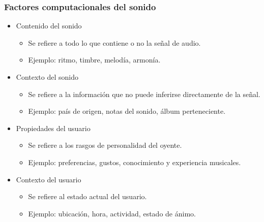 \documentclass[
10pt, %
aspectratio=169, %
]{beamer}
\begin{document}
	\begin{frame}
		
		\frametitle{Factores computacionales del sonido}
		
		\begin{itemize}
			
			\item Contenido del sonido
			\begin{itemize} 
				\item Se refiere a todo lo que contiene o no la señal de audio.
				\item Ejemplo: ritmo, timbre, melodía, armonía. 
			\end{itemize}
			
			\item Contexto del sonido
			\begin{itemize} 
				\item Se refiere a la información que no puede inferirse directamente de la señal.
				\item Ejemplo: país de origen, notas del sonido, álbum perteneciente.
			\end{itemize}
			
			\item Propiedades del usuario
			\begin{itemize}
				\item Se refiere a los rasgos de personalidad del oyente.
				\item Ejemplo: preferencias, gustos, conocimiento y  experiencia musicales.
			\end{itemize}
			
			\item Contexto del usuario
			\begin{itemize}
				\item Se refiere al estado actual del usuario.
				\item Ejemplo: ubicación, hora, actividad, estado de ánimo. 
			\end{itemize}
			
		\end{itemize}
		
	\end{frame}
	
\end{document}

